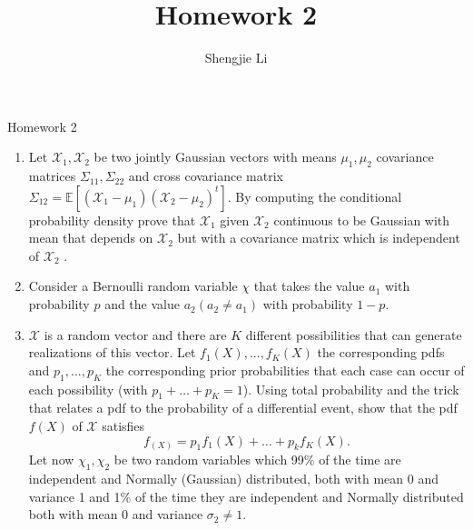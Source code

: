 \documentclass[letter, 11pt]{article}
\author{Shengjie Li}
\title{Homework 2}
\begin{document}
	\centerline{Homework 2}
	\begin{enumerate}[wide = 0pt, label = \textbf{Problem \arabic*:}]
		\item {Let $ \mathcal{X}_1 , \mathcal{X}_2 $ be two jointly Gaussian vectors with means $ \mu_1 , \mu_2 $ covariance matrices $ \Sigma_{11} , \Sigma_{22} $ and
			cross covariance matrix $ \Sigma_{12} = \mathbb{E}[(\mathcal{X}_1 - \mu_1 )(\mathcal{X}_2 - \mu_2 )^t ] $. By computing the conditional probability density
			prove that $ \mathcal{X}_1 $ given $ \mathcal{X}_2 $ continuous to be Gaussian with mean that depends on $ \mathcal{X}_2 $ but with a covariance
			matrix which is independent of $ \mathcal{X}_2 $ .}
		
		\item {Consider a Bernoulli random variable $ \chi $ that takes the value $ a_1 $ with probability $ p $ and the
			value $ a_2 (a_2 \ne a_1 ) $ with probability $ 1 −p $. }
	
		\item {$ \mathcal{X} $ is a random vector and there are $ K $ different possibilities that can generate realizations of this
			vector. Let $ f_1 (X), . . . , f_K (X) $ the corresponding pdfs and $ p_1 , . . . , p_K $ the corresponding prior probabilities
			that each case can occur of each possibility (with $ p_1 + \dots + p_K = 1 $). Using total probability and the trick
			that relates a pdf to the probability of a differential event, show that the pdf $ f (X) $ of $ \mathcal{X} $ satisfies \[ f_(X) = p_1 f_1 (X) + \dots + p_k f_K (X). \] Let now $ \chi_1 , \chi_2 $ be two random variables which 99\% of the time are independent and Normally (Gaussian)
			distributed, both with mean 0 and variance 1 and 1\% of the time they are independent and Normally
			distributed both with mean 0 and variance $ \sigma_2 \ne 1 $.}
\end{enumerate}
\end{document}
